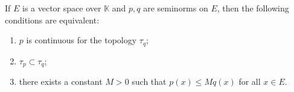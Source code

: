 If $E$ is a vector space over $\mathbb{K}$ and $p, q$ are seminorms on $E$, then the following conditions are equivalent:
\begin{enumerate}
\item[(a)] $p$ is continuous for the topology $\tau_q$;
\item[(b)] $\tau_p \subset \tau_q$;
\item[(c)] there exists a constant $M > 0$ such that $p(x) \leq M q(x)$ for all $x \in E$.
\end{enumerate}
